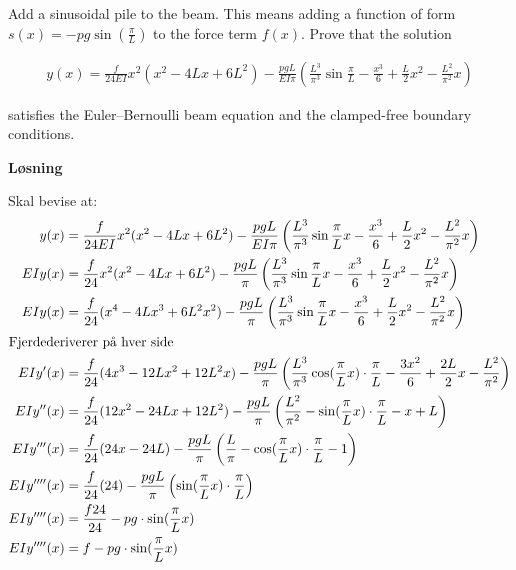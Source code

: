 %


Add a sinusoidal pile to the beam. This means adding a function of form $s(x)=-pg\sin(\frac{\pi}{L})$ to the force term $f(x)$. Prove that the solution

\begin{align}
y(x) = \frac{f}{{24EI}}{x^2}({x^2} - 4Lx + 6{L^2}) - \frac{{pgL}}{{EI\pi }}\left( {\frac{{{L^3}}}{{{\pi ^3}}}\sin \frac{\pi }{L} - \frac{{{x^3}}}{6} + \frac{L}{2}{x^2} - \frac{{{L^2}}}{{{\pi ^2}}}x} \right)
\end{align}

satisfies the Euler–Bernoulli beam equation and the clamped-free boundary conditions.

\vspace{5mm}
\textbf{Løsning}

Skal bevise at: 
\begin{align}
y(x) &= \frac{f}{{24EI}}{x^2}({x^2} - 4Lx + 6{L^2}) - \frac{{pgL}}{{EI\pi }}\left( {\frac{{{L^3}}}{{{\pi ^3}}}\sin \frac{\pi }{L}x - \frac{{{x^3}}}{6} + \frac{L}{2}{x^2} - \frac{{{L^2}}}{{{\pi ^2}}}x} \right)\nonumber\\ 
EIy(x) &= \frac{f}{{24}}{x^2}({x^2} - 4Lx + 6{L^2}) - \frac{{pgL}}{{\pi }}\left( {\frac{{{L^3}}}{{{\pi ^3}}}\sin \frac{\pi }{L}x - \frac{{{x^3}}}{6} + \frac{L}{2}{x^2} - \frac{{{L^2}}}{{{\pi ^2}}}x} \right)\nonumber\\
EIy(x) &= \frac{f}{{24}}({x^4} - 4Lx^3 + 6{L^2}{x^2}) - \frac{{pgL}}{{\pi }}\left( {\frac{{{L^3}}}{{{\pi ^3}}}\sin \frac{\pi }{L}x - \frac{{{x^3}}}{6} + \frac{L}{2}{x^2} - \frac{{{L^2}}}{{{\pi ^2}}}x} \right)\nonumber\\
\intertext{Fjerdederiverer på hver side}
EIy'(x) &= \frac{f}{{24}}(4{x^3} - 12Lx^2 + 12{L^2}x) - \frac{{pgL}}{{\pi }}\left( {\frac{{{L^3}}}{{{\pi ^3}}}\cos (\frac{\pi }{L}x) \cdot \frac{\pi}{L} - \frac{{{3x^2}}}{6} + \frac{2L}{2}x - \frac{{{L^2}}}{{{\pi ^2}}}} \right)\nonumber\\
EIy''(x) &= \frac{f}{{24}}(12{x^2} - 24Lx + 12{L^2}) - \frac{{pgL}}{{\pi }}\left( {\frac{{{L^2}}}{{{\pi ^2}}}-\sin (\frac{\pi }{L}x) \cdot \frac{\pi}{L} - x + L } \right)\nonumber\\
EIy'''(x) &= \frac{f}{{24}}(24x - 24L) - \frac{{pgL}}{{\pi }}\left( {\frac{{{L}}}{{{\pi}}}-\cos (\frac{\pi }{L}x) \cdot \frac{\pi}{L} - 1 } \right)\nonumber\\
EIy''''(x) &= \frac{f}{{24}}(24) - \frac{{pgL}}{{\pi }}\left( {\sin (\frac{\pi }{L}x) \cdot \frac{\pi}{L}  } \right)\nonumber\\
EIy''''(x) &= \frac{f24}{24} - {pg} \cdot{\sin (\frac{\pi }{L}x) } \nonumber\\
EIy''''(x) &= f - {pg} \cdot{\sin (\frac{\pi }{L}x) } \nonumber\\
\end{align}



%